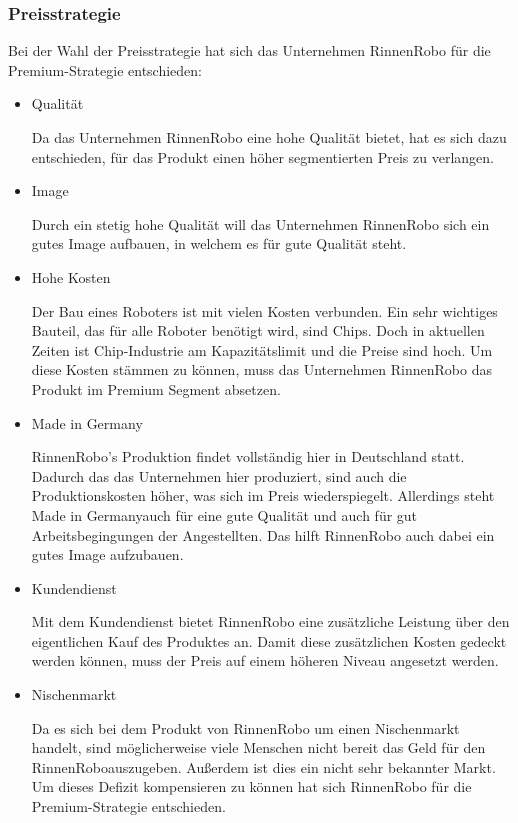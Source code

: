     \subsubsection{Preisstrategie} \label{preisstrat}
        Bei der Wahl der Preisstrategie hat sich das Unternehmen RinnenRobo für die Premium-Strategie entschieden:

    \begin{itemize}
        \item Qualität
        
            Da das Unternehmen RinnenRobo eine hohe Qualität bietet, hat es sich dazu entschieden, für das Produkt einen
            höher segmentierten Preis zu verlangen.

        \item Image
        
            Durch ein stetig hohe Qualität will das Unternehmen RinnenRobo sich ein gutes Image aufbauen, in welchem es 
            für gute Qualität steht.

        \item Hohe Kosten

            Der Bau eines Roboters ist mit vielen Kosten verbunden. Ein sehr wichtiges Bauteil, das für alle Roboter
            benötigt wird, sind Chips. Doch in aktuellen Zeiten ist Chip-Industrie am Kapazitätslimit und die Preise
            sind hoch. Um diese Kosten stämmen zu können, muss das Unternehmen RinnenRobo das Produkt im Premium Segment
            absetzen.

        \item Made in Germany
        
            RinnenRobo's Produktion findet vollständig hier in Deutschland statt. Dadurch das das Unternehmen hier 
            produziert, sind auch die Produktionskosten höher, was sich im Preis wiederspiegelt. Allerdings steht 
            \as Made in Germany\adl auch für eine gute Qualität und auch für gut Arbeitsbegingungen der Angestellten.
            Das hilft RinnenRobo auch dabei ein gutes Image aufzubauen.

        \item Kundendienst
        
            Mit dem Kundendienst bietet RinnenRobo eine zusätzliche Leistung über den eigentlichen Kauf des Produktes
            an. Damit diese zusätzlichen Kosten gedeckt werden können, muss der Preis auf einem höheren Niveau 
            angesetzt werden.

        \item Nischenmarkt
        
            Da es sich bei dem Produkt von RinnenRobo um einen Nischenmarkt handelt, sind möglicherweise viele Menschen
            nicht bereit das Geld für den \as RinnenRobo\adl auszugeben. Außerdem ist dies ein nicht sehr bekannter 
            Markt. Um dieses Defizit kompensieren zu können hat sich RinnenRobo für die Premium-Strategie entschieden.
    \end{itemize}

